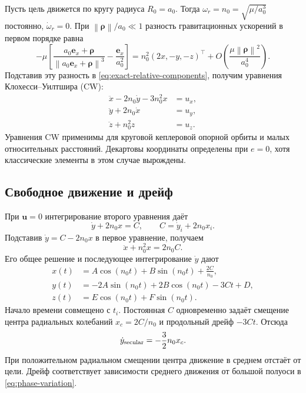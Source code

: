 \documentclass[a4paper,11pt]{article}
\numberwithin{equation}{section}
\theoremstyle{remark}
\newcommand{\vect}[1]{\boldsymbol{#1}}
\newcommand{\norm}[1]{\left\lVert#1\right\rVert}
\begin{document}
Пусть цель движется по кругу радиуса $R_0=a_0$.
Тогда $\omega_r=n_0=\sqrt{\mu/a_0^3}$ постоянно,
$\dot\omega_r=0$. При $\norm{\vect\rho}/a_0\ll1$
разность гравитационных ускорений в первом порядке равна
\begin{equation}
 -\mu\left[
 \frac{a_0\vect e_x+\vect\rho}{\norm{a_0\vect e_x+\vect\rho}^3}
 -\frac{\vect e_x}{a_0^2}\right]
 =n_0^2(2x,-y,-z)^\top
    +O\left(\frac{\mu\norm{\vect\rho}^2}{a_0^4}\right).
 \label{eq:gravity-gradient-circular}
\end{equation}
Подставив эту разность в \eqref{eq:exact-relative-components},
получим уравнения Клохесси--Уилтшира (CW):
\begin{equation}
 \boxed{\begin{aligned}
  \ddot x-2n_0\dot y-3n_0^2x&=u_x,\\
  \ddot y+2n_0\dot x&=u_y,\\
  \ddot z+n_0^2z&=u_z.
 \end{aligned}}
 \label{eq:CW}
\end{equation}
Уравнения CW \cite{cw} применимы для круговой кеплеровой
опорной орбиты и малых относительных расстояний.
Декартовы координаты определены при $e=0$,
хотя классические элементы в этом случае вырождены.

\subsection{Свободное движение и дрейф}

При $\vect u=0$ интегрирование второго уравнения даёт
\begin{equation}
 \dot y+2n_0x=C,\qquad C=\dot y_i+2n_0x_i.
 \label{eq:CW-invariant}
\end{equation}
Подставив $\dot y=C-2n_0x$ в первое уравнение, получаем
\[
 \ddot x+n_0^2x=2n_0C.
\]
Его общее решение и последующее интегрирование $\dot y$ дают
\begin{equation}
 \begin{aligned}
 x(t)&=A\cos(n_0t)+B\sin(n_0t)+\frac{2C}{n_0},\\
 y(t)&=-2A\sin(n_0t)+2B\cos(n_0t)-3Ct+D,\\
 z(t)&=E\cos(n_0t)+F\sin(n_0t).
 \end{aligned}
 \label{eq:CW-modes}
\end{equation}
Начало времени совмещено с $t_i$.
Постоянная $C$ одновременно задаёт смещение центра радиальных
колебаний $x_c=2C/n_0$ и продольный дрейф $-3Ct$.
Отсюда
\begin{equation}
 \dot y_{\rm secular}=-\frac32n_0x_c.
 \label{eq:CW-drift}
\end{equation}
При положительном радиальном смещении центра движение
в среднем отстаёт от цели. Дрейф соответствует зависимости среднего движения
от большой полуоси в \eqref{eq:phase-variation}.
\end{document}
